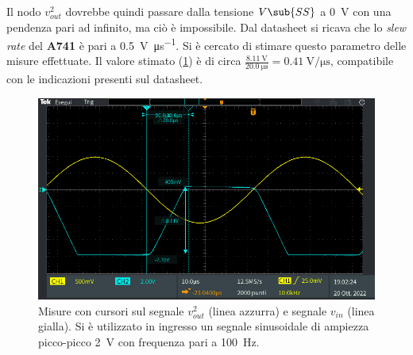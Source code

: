 Il nodo $v_{out}^2$ dovrebbe quindi passare dalla tensione $V\sub{SS}$ a \SI{0}{\volt} con una pendenza pari ad infinito, ma ciò è impossibile. Dal datasheet si ricava che lo \textit{slew rate} del \textbf{\textmu A741} è pari a \SI{0.5}{\volt\per\micro\second}. Si è cercato di stimare questo parametro delle misure effettuate. Il valore stimato (\Fig\ref{fig:slew_rate_circuito_1}) è di circa $\frac{\SI{8.11}{\volt}}{\SI{20.0}{\micro\second}}=\SI{0.41}{\volt\per\micro\second}$, compatibile con le indicazioni presenti sul datasheet.
\begin{figure}[h]
	\centering
	\includegraphics[width=\linewidth]{./ImageFiles/Laboratorio 3/TEK00006.PNG}
	\caption{Misure con cursori sul segnale $v_{out}^2$ (linea azzurra) e segnale $v_{in}$ (linea gialla). Si è utilizzato in ingresso un segnale sinusoidale di ampiezza picco-picco \SI{2}{\volt} con frequenza pari a \SI{100}{\hertz}.}
	\label{fig:slew_rate_circuito_1}
\end{figure}

